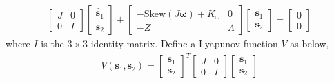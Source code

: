 \color{blue} %
\begin{equation}
\begin{aligned}
\begin{bmatrix}
J & 0 \\
0 & I
\end{bmatrix}
\begin{bmatrix}
\dot{{\boldsymbol s}_1} \\
\dot{{\boldsymbol s}_2}
\end{bmatrix}
+
\begin{bmatrix}
- \text{Skew} (J {\boldsymbol \omega}) +  K_{\omega} & 0 \\
-Z & \Lambda
\end{bmatrix}
\begin{bmatrix}
{\boldsymbol s}_1 \\
{\boldsymbol s}_2
\end{bmatrix}
=
\begin{bmatrix}
0 \\
0
\end{bmatrix}
\end{aligned}
\end{equation}
\color{black} %
where \(I\) is the \(3 \times 3\) identity matrix. Define a Lyapunov function \( V\) as below, \\
\begin{equation}
\begin{aligned}
V({\boldsymbol s}_1, {\boldsymbol s}_2) = 
\begin{bmatrix}
{\boldsymbol s}_1 \\
{\boldsymbol s}_2
\end{bmatrix} ^{T}
\begin{bmatrix}
J & 0 \\
0 & I
\end{bmatrix}
\begin{bmatrix}
{{\boldsymbol s}_1} \\
{{\boldsymbol s}_2}
\end{bmatrix}
\end{aligned}
\end{equation}\\

